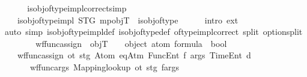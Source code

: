 \begin{isabellebody}
\ \ {\isacharparenright}{\kern0pt}{\isachardoublequoteclose}\isanewline
\isanewline
\ \ \isamarkupfalse%
\ is{\isacharunderscore}{\kern0pt}obj{\isacharunderscore}{\kern0pt}of{\isacharunderscore}{\kern0pt}type{\isacharunderscore}{\kern0pt}impl{\isacharunderscore}{\kern0pt}correct{\isacharbrackleft}{\kern0pt}simp{\isacharbrackright}{\kern0pt}{\isacharcolon}{\kern0pt}\isanewline
\ \ \ \ {\isachardoublequoteopen}is{\isacharunderscore}{\kern0pt}obj{\isacharunderscore}{\kern0pt}of{\isacharunderscore}{\kern0pt}type{\isacharunderscore}{\kern0pt}impl\ STG\ mp{\isacharunderscore}{\kern0pt}objT\ {\isacharequal}{\kern0pt}\ is{\isacharunderscore}{\kern0pt}obj{\isacharunderscore}{\kern0pt}of{\isacharunderscore}{\kern0pt}type{\isachardoublequoteclose}\isanewline
%
\isadelimproof
\ \ \ \ %
\endisadelimproof
%
\isatagproof
{}\isamarkupfalse%
\ {\isacharparenleft}{\kern0pt}intro\ ext{\isacharparenright}{\kern0pt}\isanewline
\ \ \ \ \isamarkupfalse%
\ {\isacharparenleft}{\kern0pt}auto\ simp{\isacharcolon}{\kern0pt}\ is{\isacharunderscore}{\kern0pt}obj{\isacharunderscore}{\kern0pt}of{\isacharunderscore}{\kern0pt}type{\isacharunderscore}{\kern0pt}impl{\isacharunderscore}{\kern0pt}def\ is{\isacharunderscore}{\kern0pt}obj{\isacharunderscore}{\kern0pt}of{\isacharunderscore}{\kern0pt}type{\isacharunderscore}{\kern0pt}def\ of{\isacharunderscore}{\kern0pt}type{\isacharunderscore}{\kern0pt}impl{\isacharunderscore}{\kern0pt}correct\ split{\isacharcolon}{\kern0pt}\ option{\isachardot}{\kern0pt}split{\isacharparenright}{\kern0pt}\isanewline
\ \ \ \ \isamarkupfalse%
%
\endisatagproof
{\isafoldproof}%
%
\isadelimproof
\isanewline
%
\endisadelimproof
\isanewline
\ \ \isamarkupfalse%
\ wf{\isacharunderscore}{\kern0pt}func{\isacharunderscore}{\kern0pt}assign{\isacharprime}{\kern0pt}\ {\isacharcolon}{\kern0pt}{\isacharcolon}{\kern0pt}\ {\isachardoublequoteopen}objT\ {\isasymRightarrow}\ {\isacharunderscore}{\kern0pt}\ {\isasymRightarrow}\ object\ atom\ formula\ {\isasymRightarrow}\ bool{\isachardoublequoteclose}\ \ \isanewline
\ \ \ \ {\isachardoublequoteopen}wf{\isacharunderscore}{\kern0pt}func{\isacharunderscore}{\kern0pt}assign{\isacharprime}{\kern0pt}\ ot\ stg\ {\isacharparenleft}{\kern0pt}Atom\ {\isacharparenleft}{\kern0pt}eqAtm\ {\isacharparenleft}{\kern0pt}FuncEnt\ f\ args{\isacharparenright}{\kern0pt}\ {\isacharparenleft}{\kern0pt}TimeEnt\ d{\isacharparenright}{\kern0pt}{\isacharparenright}{\kern0pt}{\isacharparenright}{\kern0pt}\ \isanewline
\ \ \ \ \ \ {\isasymlongleftrightarrow}\ wf{\isacharunderscore}{\kern0pt}func{\isacharunderscore}{\kern0pt}args{\isacharprime}{\kern0pt}\ {\isacharparenleft}{\kern0pt}Mapping{\isachardot}{\kern0pt}lookup\ ot{\isacharparenright}{\kern0pt}\ stg\ {\isacharparenleft}{\kern0pt}f{\isacharcomma}{\kern0pt}args{\isacharparenright}{\kern0pt}{\isachardoublequoteclose}\isanewline

\end{isabellebody}
